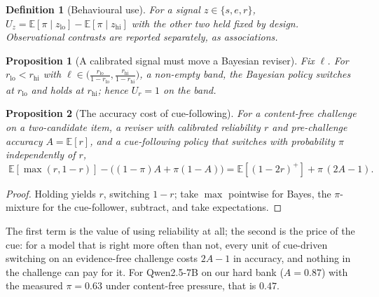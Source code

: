 \documentclass{article}
\newtheorem{proposition}{Proposition}
\newtheorem{definition}{Definition}
\newcommand{\Uz}[1]{U_{#1}}
\begin{document}
\begin{definition}[Behavioural use]\label{def:use}
For a signal $z\in\{s,e,r\}$, $\Uz{z}=\mathbb{E}[\pi\mid z_{\mathrm{lo}}]-\mathbb{E}[\pi\mid z_{\mathrm{hi}}]$ with the other two held fixed by design. Observational contrasts are reported separately, as associations.
\end{definition}
\begin{proposition}[A calibrated signal must move a Bayesian reviser]\label{prop:bayes}
Fix $\ell$. For $r_{\mathrm{lo}}<r_{\mathrm{hi}}$ with $\ell\in\big(\tfrac{r_{\mathrm{lo}}}{1-r_{\mathrm{lo}}},\tfrac{r_{\mathrm{hi}}}{1-r_{\mathrm{hi}}}\big)$, a non-empty band, the Bayesian policy switches at $r_{\mathrm{lo}}$ and holds at $r_{\mathrm{hi}}$; hence $\Uz{r}=1$ on the band.
\end{proposition}
\begin{proposition}[The accuracy cost of cue-following]\label{prop:regret}
For a content-free challenge on a two-candidate item, a reviser with calibrated reliability $r$ and pre-challenge accuracy $A=\mathbb{E}[r]$, and a cue-following policy that switches with probability $\pi$ independently of $r$,
$\;\mathbb{E}[\max(r,1-r)]-\big((1-\pi)A+\pi(1-A)\big)=\mathbb{E}[(1-2r)^{+}]+\pi\,(2A-1).$
\end{proposition}
\begin{proof}Holding yields $r$, switching $1-r$; take $\max$ pointwise for Bayes, the $\pi$-mixture for the cue-follower, subtract, and take expectations.\end{proof}
The first term is the value of using reliability at all; the second is the price of the cue: for a model that is right more often than not, every unit of cue-driven switching on an evidence-free challenge costs $2A-1$ in accuracy, and nothing in the challenge can pay for it. For Qwen2.5-7B on our hard bank ($A=0.87$) with the measured $\pi=0.63$ under content-free pressure, that is $0.47$.
\end{document}
